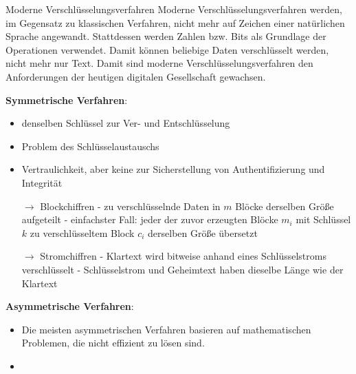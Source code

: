 \documentclass[german]{spicker}
\begin{document}
\begin{defi}{Moderne Verschlüsselungsverfahren}
    Moderne Verschlüsselungsverfahren werden, im Gegensatz zu klassischen Verfahren,
    nicht mehr auf Zeichen einer natürlichen Sprache angewandt. Stattdessen werden
    Zahlen bzw. Bits als Grundlage der Operationen verwendet. Damit können
    beliebige Daten verschlüsselt werden, nicht mehr nur Text. Damit sind moderne
    Verschlüsselungsverfahren den Anforderungen der heutigen digitalen Gesellschaft
    gewachsen.

    \textbf{Symmetrische Verfahren}:
    \begin{itemize}
        \item denselben Schlüssel zur Ver- und Entschlüsselung
        \item Problem des Schlüsselaustauschs
        \item Vertraulichkeit, aber keine zur Sicherstellung von Authentifizierung und Integrität
        \item[$\to$] Blockchiffren
            \subitem -  zu verschlüsselnde Daten in $m$ Blöcke derselben Größe aufgeteilt
            \subitem -  einfachster Fall: jeder der zuvor erzeugten Blöcke $m_i$ mit Schlüssel $k$
            \subitem zu verschlüsseltem Block $c_i$ derselben Größe übersetzt
        \item[$\to$] Stromchiffren
            \subitem -  Klartext wird bitweise anhand eines Schlüsselstroms verschlüsselt
            \subitem - Schlüsselstrom und Geheimtext haben dieselbe Länge wie der Klartext
    \end{itemize}

    \textbf{Asymmetrische Verfahren}:
    \begin{itemize}
        \item Die meisten asymmetrischen Verfahren basieren auf mathematischen Problemen, die nicht effizient zu lösen sind.
        \item
    \end{itemize}
\end{defi}
\end{document}
